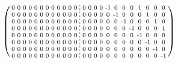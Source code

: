 \documentclass[pdftex,a4paper,parskip,listof=totoc,bibliography=totoc,onehalfspacing,12pt]{scrreprt}
\newcommand*\dashline{\hspace{-0.3em}\rotatebox[origin=c]{90}{\scalebox{-0.3}[1]{$-~~-$}}\hspace{-0.3em}}
\begin{document}
\begin{align*}
\begin{psmallmatrix}
0 & 0 & 0 & 0 & 0 & 0 & 0 & 0 & 0 & 0 & 0 & 0 &\dashline& 0 & 0 & 0 & 0 & \text{-}1 & 0 & 0 & 0 & 1 & 0 & 0 & 0 \\
0 & 0 & 0 & 0 & 0 & 0 & 0 & 0 & 0 & 0 & 0 & 0 &\dashline& 0 & 0 & 0 & 0 & 0 & \text{-}1 & 0 & 0 & 0 & 1 & 0 & 0 \\
0 & 0 & 0 & 0 & 0 & 0 & 0 & 0 & 0 & 0 & 0 & 0 &\dashline& 0 & 0 & 0 & 0 & 0 & 0 & \text{-}1 & 0 & 0 & 0 & 1 & 0 \\
0 & 0 & 0 & 0 & 0 & 0 & 0 & 0 & 0 & 0 & 0 & 0 &\dashline& 0 & 0 & 0 & 0 & 0 & 0 & 0 & \text{-}1 & 0 & 0 & 0 & 1 \\
0 & 0 & 0 & 0 & 0 & 0 & 0 & 0 & 0 & 0 & 0 & 0 &\dashline& 0 & 0 & 0 & 0 & 0 & 0 & 0 & 0 & \text{-}1 & 0 & 0 & 0 \\
0 & 0 & 0 & 0 & 0 & 0 & 0 & 0 & 0 & 0 & 0 & 0 &\dashline& 0 & 0 & 0 & 0 & 0 & 0 & 0 & 0 & 0 & \text{-}1 & 0 & 0 \\
0 & 0 & 0 & 0 & 0 & 0 & 0 & 0 & 0 & 0 & 0 & 0 &\dashline& 0 & 0 & 0 & 0 & 0 & 0 & 0 & 0 & 0 & 0 & \text{-}1 & 0 \\
0 & 0 & 0 & 0 & 0 & 0 & 0 & 0 & 0 & 0 & 0 & 0 &\dashline& 0 & 0 & 0 & 0 & 0 & 0 & 0 & 0 & 0 & 0 & 0 & \text{-}1 \\
\end{psmallmatrix}
\end{align*}
\end{document}
